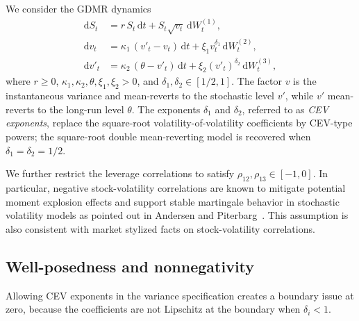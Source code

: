 \documentclass[pdflatex,sn-mathphys-num]{sn-jnl}
\theoremstyle{thmstyleone}%
\theoremstyle{thmstylethree}%
\newtheorem{assumption}[theorem]{Assumption}
\theoremstyle{thmstyletwo}%
\newcommand{\dd}{\mathrm d}
\newcommand{\Q}{\mathbb Q}
\begin{document}
We consider the GDMR dynamics
\begin{equation}\label{eq:gdmr}
\begin{aligned}
\dd S_t &= r\,S_t\,\dd t + S_t\sqrt{v_t}\,\dd W^{(1)}_t,\\
\dd v_t &= \kappa_1\,(v'_t - v_t)\,\dd t + \xi_1 v_t^{\delta_1}\,\dd W^{(2)}_t,\\
\dd v'_t &= \kappa_2\,(\theta - v'_t)\,\dd t + \xi_2 (v'_t)^{\delta_2}\,\dd W^{(3)}_t,
\end{aligned}
\end{equation}
where $r\ge0$, $\kappa_1,\kappa_2,\theta,\xi_1,\xi_2>0$, and
$\delta_1,\delta_2\in[1/2,1]$. The factor $v$ is the instantaneous variance and
mean-reverts to the stochastic level $v'$, while $v'$ mean-reverts to the
long-run level $\theta$. The exponents $\delta_1$ and $\delta_2$, referred to as \emph{CEV exponents}, replace the
square-root volatility-of-volatility coefficients by CEV-type powers; the
square-root double mean-reverting model is recovered when
$\delta_1=\delta_2=1/2$.

We further restrict the leverage correlations to satisfy 
$
\rho_{12},
\rho_{13} \in [-1,0].
$
In particular, negative stock-volatility correlations are known to mitigate potential moment explosion effects and support stable martingale behavior in stochastic volatility models as pointed out in Andersen and Piterbarg~\cite{AndersenPiterbarg2007}. This assumption is also consistent with market stylized facts on stock-volatility correlations.




\subsection{Well-posedness and nonnegativity}\label{sec:wellposed}

Allowing CEV exponents in the variance specification creates a boundary issue at zero, because the coefficients are not Lipschitz at the boundary when $\delta_i<1$. 
\end{document}
